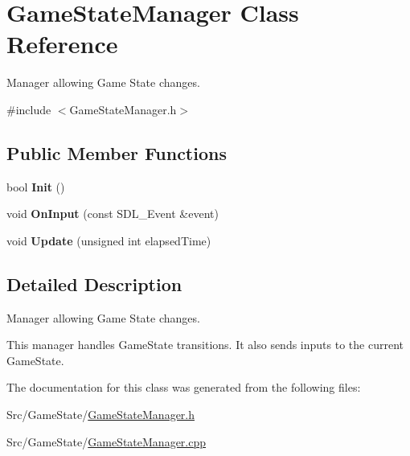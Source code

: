 \hypertarget{classGameStateManager}{\section{Game\-State\-Manager Class Reference}
\label{classGameStateManager}
}


Manager allowing Game State changes.  




{\ttfamily \#include $<$Game\-State\-Manager.\-h$>$}

\subsection*{Public Member Functions}
\begin{DoxyCompactItemize}
\item 
\hypertarget{classGameStateManager_a668ff902385de714a6614350f1c8add6}{bool {\bfseries Init} ()}\label{classGameStateManager_a668ff902385de714a6614350f1c8add6}

\item 
\hypertarget{classGameStateManager_a05af26236b4600ebc2c760728a8a0f1f}{void {\bfseries On\-Input} (const S\-D\-L\-\_\-\-Event \&event)}\label{classGameStateManager_a05af26236b4600ebc2c760728a8a0f1f}

\item 
\hypertarget{classGameStateManager_aaeb3c406d15defe8926a3deb37d546c9}{void {\bfseries Update} (unsigned int elapsed\-Time)}\label{classGameStateManager_aaeb3c406d15defe8926a3deb37d546c9}

\end{DoxyCompactItemize}


\subsection{Detailed Description}
Manager allowing Game State changes. 

This manager handles Game\-State transitions. It also sends inputs to the current Game\-State. 

The documentation for this class was generated from the following files\-:\begin{DoxyCompactItemize}
\item 
Src/\-Game\-State/\hyperlink{GameStateManager_8h}{Game\-State\-Manager.\-h}\item 
Src/\-Game\-State/\hyperlink{GameStateManager_8cpp}{Game\-State\-Manager.\-cpp}\end{DoxyCompactItemize}
